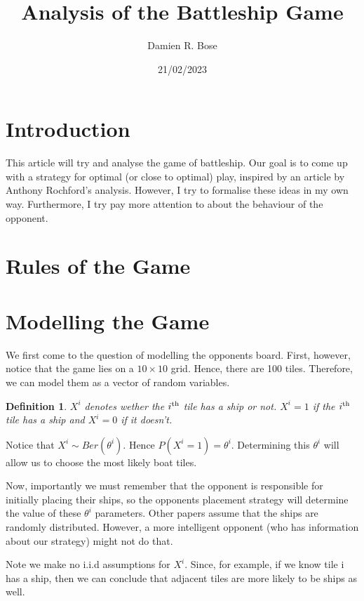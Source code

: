 \documentclass[11pt]{article}
\newtheorem{definition}{Definition}
\begin{document}
\title{Analysis of the Battleship Game}
\author{Damien R. Bose}
\date{21/02/2023}

\maketitle

\section{Introduction}

This article will try and analyse the game of battleship. Our goal is to come up with a strategy for optimal (or close to optimal) play, inspired by an article by Anthony Rochford's analysis\cite{rochford}. However, I try to formalise these ideas in my own way. Furthermore, I try pay more attention to about the behaviour of the opponent. 

\section{Rules of the Game}

\section{Modelling the Game}

We first come to the question of modelling the opponents board. First, however, notice that the game lies on a $10 \times 10$ grid. Hence, there are 100 tiles. Therefore, we can model them as a vector of random variables.

\begin{definition}
$X^i$ denotes wether the $i\textsuperscript{th}$ tile has a ship or not. $X^i = 1$ if the $i\textsuperscript{th}$ tile has a ship and $X^i = 0$ if it doesn't.
\end{definition}

Notice that $X^i \sim Ber(\theta^i)$. Hence $P(X^i = 1) = \theta^i$. Determining this $\theta^i$ will allow us to choose the most likely boat tiles. 

Now, importantly we must remember that the opponent is responsible for initially placing their ships, so the opponents placement strategy will determine the value of these $\theta^i$ parameters. Other papers\cite{rochford}\cite{alemi} assume that the ships are randomly distributed. However, a more intelligent opponent (who has information about our strategy) might not do that. 

Note we make no i.i.d assumptions for $X^i$. Since, for example, if we know tile i has a ship, then we can conclude that adjacent tiles are more likely to be ships as well.
\end{document}

